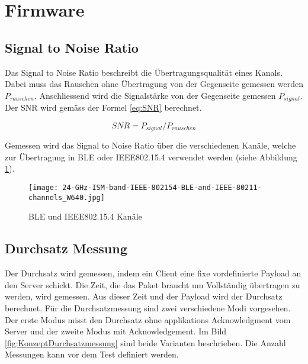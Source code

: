 	\clearpage
\section{Firmware}\label{sec:Firmware}



\subsection{Signal to Noise Ratio}\label{subsec:SignaltoNoiseRatio}

Das Signal to Noise Ratio beschreibt die Übertragungsqualität eines Kanals. Dabei muss das Rauschen ohne Übertragung von der Gegenseite gemessen werden $P_{rauschen}$. Anschliessend wird die Signalstärke von der Gegenseite gemessen $P_{signal}$. Der SNR wird gemäss der Formel \ref{eq:SNR} berechnet.

\begin{equation} \label{eq:SNR}
 SNR = P_{signal}/P_{rauschen}
\end{equation}

Gemessen wird das Signal to Noise Ratio über die verschiedenen Kanäle, welche zur Übertragung in BLE oder IEEE802.15.4 verwendet werden (siehe Abbildung \ref{fig:BLEIEEE802_15_4_Kanaele}). 

\begin{figure}[H]
	\centering
	\texttt{[image: 24-GHz-ISM-band-IEEE-802154-BLE-and-IEEE-80211-channels\_W640.jpg]}
	\caption{BLE und IEEE802.15.4 Kanäle}\label{fig:BLEIEEE802_15_4_Kanaele}
\end{figure}

\newpage


\subsection{Durchsatz Messung}\label{subsec:DurchsatzMessung}
Der Durchsatz wird gemessen, indem ein Client eine fixe vordefinierte Payload an den Server schickt. Die Zeit, die das Paket braucht um Vollständig übertragen zu werden, wird gemessen. Aus dieser Zeit und der Payload wird der Durchsatz berechnet. Für die Durchsatzmessung sind zwei verschiedene Modi vorgesehen. Der erste Modus misst den Durchsatz ohne applikations Acknowledgment vom Server und der zweite Modus mit Acknowledgement. Im Bild \ref{fig:KonzeptDurchsatzmessung} sind beide Varianten beschrieben. Die Anzahl Messungen kann vor dem Test definiert werden. 

